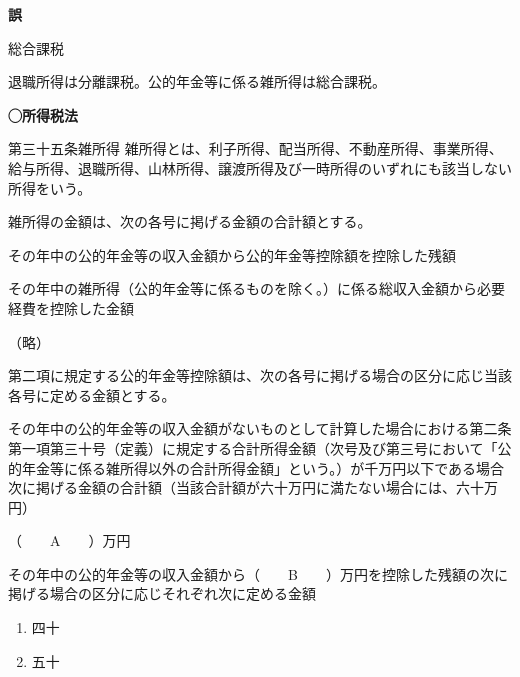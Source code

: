 \begin{answerbox}
  \textbf{誤}

  総合課税
\end{answerbox}

\begin{explanationbox}
  退職所得は分離課税。公的年金等に係る雑所得は総合課税。
\end{explanationbox}

\begin{fillblank}[年金1 2022 問題1(6)(ア)]
    \noindent \textbf{◯所得税法}
  \begin{lawstructure}
    \begin{lawarticle}{第三十五条}{雑所得}
      雑所得とは、利子所得、配当所得、不動産所得、事業所得、給与所得、退職所得、山林所得、譲渡所得及び一時所得のいずれにも該当しない所得をいう。
      
      雑所得の金額は、次の各号に掲げる金額の合計額とする。

      その年中の公的年金等の収入金額から公的年金等控除額を控除した残額

      その年中の雑所得（公的年金等に係るものを除く。）に係る総収入金額から必要経費を控除した金額

      （略）

      第二項に規定する公的年金等控除額は、次の各号に掲げる場合の区分に応じ当該各号に定める金額とする。

      その年中の公的年金等の収入金額がないものとして計算した場合における第二条第一項第三十号（定義）に規定する合計所得金額（次号及び第三号において「公的年金等に係る雑所得以外の合計所得金額」という。）が千万円以下である場合　次に掲げる金額の合計額（当該合計額が六十万円に満たない場合には、六十万円）

      （　　A　　）万円
      
      その年中の公的年金等の収入金額から（　　B　　）万円を控除した残額の次に掲げる場合の区分に応じそれぞれ次に定める金額
    
    \end{lawarticle}
  \end{lawstructure}
\end{fillblank}

\begin{answerbox}
  \begin{enumerate}[A:]
    \item 四十
    \item 五十
  \end{enumerate}
\end{answerbox}

